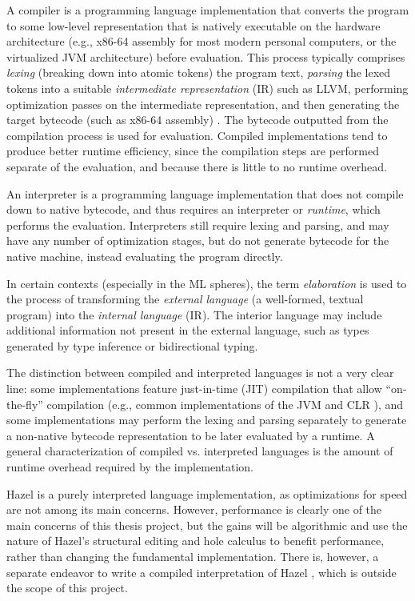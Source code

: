 A compiler is a programming language implementation that converts the program to some low-level representation that is natively executable on the hardware architecture (e.g., x86-64 assembly for most modern personal computers, or the virtualized JVM architecture) before evaluation. This process typically comprises \textit{lexing} (breaking down into atomic tokens) the program text, \textit{parsing} the lexed tokens into a suitable \textit{intermediate representation} (IR) such as LLVM, performing optimization passes on the intermediate representation, and then generating the target bytecode (such as x86-64 assembly) \cite{aho86}. The bytecode outputted from the compilation process is used for evaluation. Compiled implementations tend to produce better runtime efficiency, since the compilation steps are performed separate of the evaluation, and because there is little to no runtime overhead.

An interpreter is a programming language implementation that does not compile down to native bytecode, and thus requires an interpreter or \textit{runtime}, which performs the evaluation. Interpreters still require lexing and parsing, and may have any number of optimization stages, but do not generate bytecode for the native machine, instead evaluating the program directly.

In certain contexts (especially in the ML spheres), the term \textit{elaboration} \cite{harper2000type} is used to the process of transforming the \textit{external language} (a well-formed, textual program) into the \textit{internal language} (IR). The interior language may include additional information not present in the external language, such as types generated by type inference or bidirectional typing.

The distinction between compiled and interpreted languages is not a very clear line: some implementations feature just-in-time (JIT) compilation that allow ``on-the-fly'' compilation (e.g., common implementations of the JVM and CLR \cite{sestoft2002runtime}), and some implementations may perform the lexing and parsing separately to generate a non-native bytecode representation to be later evaluated by a runtime. A general characterization of compiled vs. interpreted languages is the amount of runtime overhead required by the implementation.

Hazel is a purely interpreted language implementation, as optimizations for speed are not among its main concerns. However, performance is clearly one of the main concerns of this thesis project, but the gains will be algorithmic and use the nature of Hazel's structural editing and hole calculus to benefit performance, rather than changing the fundamental implementation. There is, however, a separate endeavor to write a compiled interpretation of Hazel \cite{hazelc}, which is outside the scope of this project.

